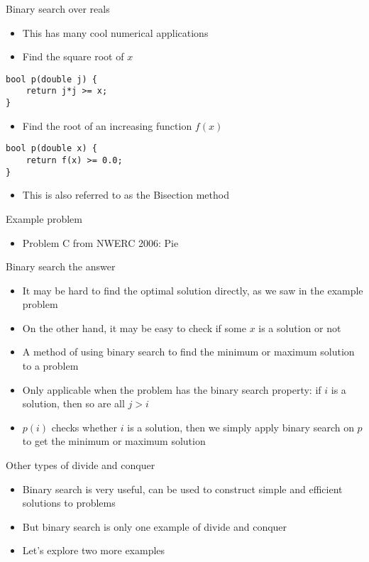 \documentclass[12pt,t]{beamer}
\newcommand{\bi}{\begin{itemize}}
\newcommand{\ei}{\end{itemize}}
\begin{document}
\begin{frame}[fragile]{Binary search over reals}
    \bi
        \item This has many cool numerical applications
        \vspace{5pt}
        \item Find the square root of $x$
    \ei
    \begin{verbatim}
bool p(double j) {
    return j*j >= x;
}
    \end{verbatim}
    \bi
        \item Find the root of an increasing function $f(x)$
    \ei
    \begin{verbatim}
bool p(double x) {
    return f(x) >= 0.0;
}
    \end{verbatim}

    \bi
        \item This is also referred to as the Bisection method
    \ei
\end{frame}


\begin{frame}{Example problem}
    \bi
        \item Problem C from NWERC 2006: Pie
    \ei
\end{frame}

\begin{frame}{Binary search the answer}
    \vspace{10pt}
    \bi
        \item It may be hard to find the optimal solution directly, as we saw in the example problem
        \item On the other hand, it may be easy to check if some $x$ is a solution or not
        \vspace{5pt}
        \item A method of using binary search to find the minimum or maximum solution to a problem
        \item Only applicable when the problem has the binary search property: if $i$ is a solution, then so are all $j > i$
        \vspace{5pt}
        \item $p(i)$ checks whether $i$ is a solution, then we simply apply binary search on $p$ to get the minimum or maximum solution
    \ei
\end{frame}

\begin{frame}{Other types of divide and conquer}
    \vspace{20pt}
    \bi
        \item Binary search is very useful, can be used to construct simple and efficient solutions to problems
        \item But binary search is only one example of divide and conquer
        \item Let's explore two more examples
    \ei
\end{frame}
\end{document}
